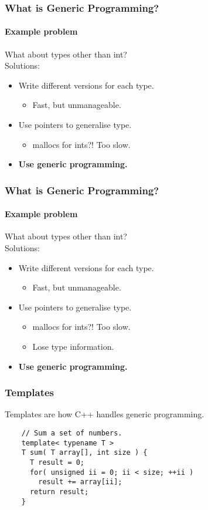\begin{frame}
  \frametitle{What is Generic Programming?}
  \framesubtitle{Example problem}
  What about types other than int? \\
  Solutions:
  \begin{itemize}
  \item Write different versions for each type.
    \begin{itemize}
    \item Fast, but unmanageable.
    \end{itemize}
  \item Use pointers to generalise type.
    \begin{itemize}
    \item mallocs for ints?! Too slow.
    \end{itemize}
  \item {\bf Use generic programming.}
  \end{itemize}
\end{frame}

\begin{frame}
  \frametitle{What is Generic Programming?}
  \framesubtitle{Example problem}
  What about types other than int? \\
  Solutions:
  \begin{itemize}
  \item Write different versions for each type.
    \begin{itemize}
    \item Fast, but unmanageable.
    \end{itemize}
  \item Use pointers to generalise type.
    \begin{itemize}
    \item mallocs for ints?! Too slow.
    \item Lose type information.
    \end{itemize}
  \item {\bf Use generic programming.}
  \end{itemize}
\end{frame}

\begin{frame}[fragile]
  \frametitle{Templates}
  Templates are how C++ handles generic programming.
  \begin{example}
    \begin{lstlisting}
    // Sum a set of numbers.
    template< typename T >
    T sum( T array[], int size ) {
      T result = 0;
      for( unsigned ii = 0; ii < size; ++ii )
        result += array[ii];
      return result;
    }
    \end{lstlisting}
  \end{example}
\end{frame}

